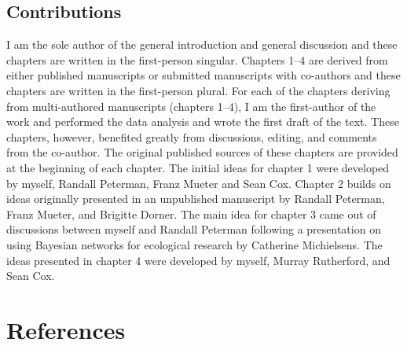 \section{Contributions}\label{contributions}

I am the sole author of the general introduction and general discussion
and these chapters are written in the first-person singular. Chapters
1--4 are derived from either published manuscripts or submitted
manuscripts with co-authors and these chapters are written in the
first-person plural. For each of the chapters deriving from
multi-authored manuscripts (chapters 1--4), I am the first-author of the
work and performed the data analysis and wrote the first draft of the
text. These chapters, however, benefited greatly from discussions,
editing, and comments from the co-author. The original published sources
of these chapters are provided at the beginning of each chapter. The
initial ideas for chapter 1 were developed by myself, Randall Peterman,
Franz Mueter and Sean Cox. Chapter 2 builds on ideas originally
presented in an unpublished manuscript by Randall Peterman, Franz
Mueter, and Brigitte Dorner. The main idea for chapter 3 came out of
discussions between myself and Randall Peterman following a presentation
on using Bayesian networks for ecological research by Catherine
Michielsens. The ideas presented in chapter 4 were developed by myself,
Murray Rutherford, and Sean Cox.

\chapter{References}\label{references}
